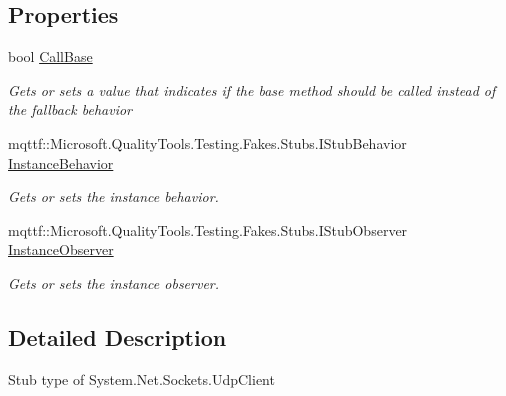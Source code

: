 \subsection*{Properties}
\begin{DoxyCompactItemize}
\item 
bool \hyperlink{class_system_1_1_net_1_1_sockets_1_1_fakes_1_1_stub_udp_client_a10d2bae49ea624902827781087ab4d8e}{Call\-Base}
\begin{DoxyCompactList}\small\item\em Gets or sets a value that indicates if the base method should be called instead of the fallback behavior\end{DoxyCompactList}\item 
mqttf\-::\-Microsoft.\-Quality\-Tools.\-Testing.\-Fakes.\-Stubs.\-I\-Stub\-Behavior \hyperlink{class_system_1_1_net_1_1_sockets_1_1_fakes_1_1_stub_udp_client_af504844dcf49d075ccb56d3890a199d2}{Instance\-Behavior}
\begin{DoxyCompactList}\small\item\em Gets or sets the instance behavior.\end{DoxyCompactList}\item 
mqttf\-::\-Microsoft.\-Quality\-Tools.\-Testing.\-Fakes.\-Stubs.\-I\-Stub\-Observer \hyperlink{class_system_1_1_net_1_1_sockets_1_1_fakes_1_1_stub_udp_client_a1a5813c18e0eef6a9d000a848ac2c284}{Instance\-Observer}
\begin{DoxyCompactList}\small\item\em Gets or sets the instance observer.\end{DoxyCompactList}\end{DoxyCompactItemize}


\subsection{Detailed Description}
Stub type of System.\-Net.\-Sockets.\-Udp\-Client



